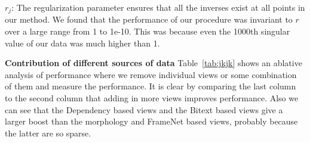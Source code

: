 \documentclass[11pt]{article}
\begin{document}
$r_j$: The regularization parameter ensures that all the
  inverses exist at all points in our method. We found that the
  performance of our  procedure was invariant to $r$ over a large
  range from 1 to 1e-10. This was because even the 1000th singular
  value of  our data was much higher than 1.

\noindent\textbf{Contribution of different sources of data}
 Table~\ref{tab:jkjk} shows an ablative analysis of performance where we
 remove individual views or some combination of them and measure the
 performance.  It is clear by comparing the last column to the second
 column that adding in more views 
 improves performance. Also we can see that the Dependency based views and the Bitext
 based views give a larger boost than the morphology and FrameNet
 based views, probably because the latter are so sparse.
\end{document}
